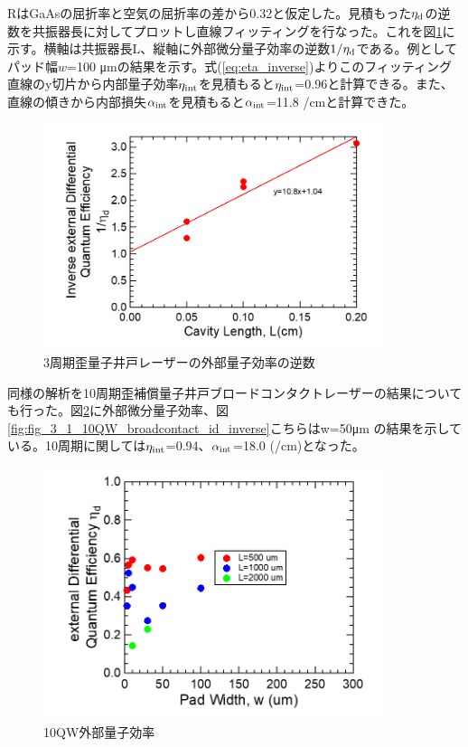 {RはGaAsの屈折率と空気の屈折率の差から0.32と仮定した。見積もった$\eta_{\rm{d}}$の逆数を共振器長に対してプロットし直線フィッティングを行なった。これを図\ref{fig:fig_3_1_3QW_broadcontact_id_inverse}に示す。横軸は共振器長L、縦軸に外部微分量子効率の逆数$1/\eta_{\rm{d}}$である。例としてパッド幅$w$=100 \si{\micro\metre}の結果を示す。式(\ref{eq:eta_inverse})よりこのフィッティング直線のy切片から内部量子効率$\eta_{\rm{int}}$を見積もると$\eta_{\rm{int}}$=0.96と計算できる。また、直線の傾きから内部損失$\alpha_{\rm{int}}$を見積もると$\alpha_{\rm{int}}$=11.8 /cmと計算できた。
\begin{figure}[h]
	\centering
	\includegraphics[width=10cm]{figure/fig_3_1_3QW_broadcontact_id_inverse.png}
	\caption{3周期歪量子井戸レーザーの外部量子効率の逆数}
	\label{fig:fig_3_1_3QW_broadcontact_id_inverse}
\end{figure}



\newpage

同様の解析を10周期歪補償量子井戸ブロードコンタクトレーザーの結果についても行った。図\ref{fig:fig_3_1_10QW_broadcontact_id}に外部微分量子効率、図\ref{fig:fig_3_1_10QW_broadcontact_id_inverse}こちらはw=50\si{\micro\metre} の結果を示している。10周期に関しては$\eta_{\rm{int}}$=0.94、$\alpha_{\rm{int}}$=18.0 (/cm)となった。
\begin{figure}[h]
	\centering
	\includegraphics[width=10cm]{figure/fig_3_1_10QW_broadcontact_id.png}
	\caption{10QW外部量子効率}
	\label{fig:fig_3_1_10QW_broadcontact_id}
\end{figure}

}
